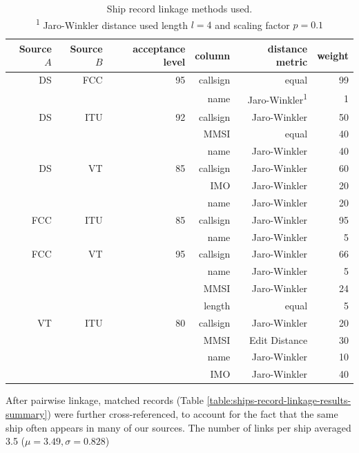 \begin{table}[htbp]
  \begin{tabular}{rrrrrr} %
    \hline
    Source $A$ & Source $B$ & acceptance level & column & distance metric & weight \\
    \hline
     DS & FCC & 95 & callsign & equal & 99 \\
        &     &    & name & Jaro-Winkler\textsuperscript{1} & 1 \\
     DS & ITU & 92 & callsign & Jaro-Winkler & 50 \\
        &     &    & MMSI & equal & 40 \\
        &     &    & name & Jaro-Winkler & 40 \\
     DS &  VT & 85 & callsign & Jaro-Winkler & 60 \\
        &     &    & IMO & Jaro-Winkler & 20 \\
        &     &    & name & Jaro-Winkler & 20 \\
    FCC & ITU & 85 & callsign & Jaro-Winkler & 95 \\
        &     &    & name & Jaro-Winkler & 5 \\
    FCC &  VT & 95 & callsign & Jaro-Winkler & 66 \\
        &     &    & name & Jaro-Winkler & 5 \\
        &     &    & MMSI & Jaro-Winkler & 24 \\
        &     &    & length & equal & 5 \\
     VT & ITU & 80 & callsign & Jaro-Winkler & 20 \\
        &     &    & MMSI & Edit Distance & 30 \\
        &     &    & name & Jaro-Winkler & 10 \\
        &     &    & IMO & Jaro-Winkler & 40 \\
  \end{tabular}
  \caption{Ship record linkage methods used. \\
    \textsuperscript{1} Jaro-Winkler distance used length $l = 4$ and scaling factor $p = 0.1$}
  \label{table:ships-record-linkage-methods}
\end{table}

After pairwise linkage, matched records (Table \ref{table:ships-record-linkage-results-summary}) were further cross-referenced, %
 to account for the fact that the same ship often appears in many of our sources. The number of links per ship averaged 3.5 ($\mu = 3.49, \sigma = 0.828$) %

